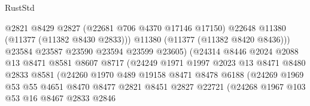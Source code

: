 \begin{lexlean}{RustStd}
\begin{coremodule}
                                      @2821
                                      @8429
                                      @2827
                                      (@22681 @706 @4370 @17146 @17150)
                                      @22648
                                      @11380
                                      (@11377 (@11382 @8430 @2833)))
                                    @11380
                                    (@11377 (@11382 @8420 @8436)))
                                  @23584
                                  @23587
                                  @23590
                                  @23594
                                  @23599
                                  @23605)
                                (@24314
                                  @8446
                                  @2024
                                  @2088
                                  @13
                                  @8471
                                  @8581
                                  @8607
                                  @8717
                                  (@24249
                                    @1971
                                    @1997
                                    @2023
                                    @13
                                    @8471
                                    @8480
                                    @2833
                                    @8581
                                    (@24260
                                      @1970
                                      @489
                                      @19158
                                      @8471
                                      @8478
                                      @6188
                                      (@24269
                                        @1969
                                        @53
                                        @55
                                        @4651
                                        @8470
                                        @8477
                                        @2821
                                        @8451
                                        @2827
                                        @22721
                                        (@24268
                                          @1967
                                          @103
                                          @53
                                          @16
                                          @8467
                                          @2833
                                          @2846

\end{coremodule}
\end{lexlean}
